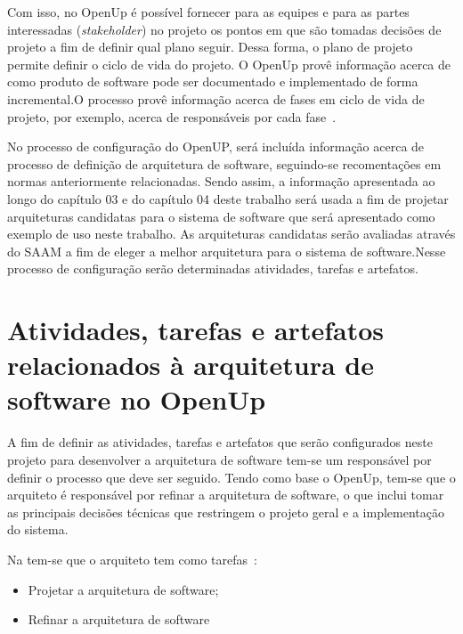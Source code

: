 Com isso, no OpenUp é possível fornecer para as equipes e para as partes interessadas (\emph{stakeholder}) no projeto os pontos em que são tomadas decisões de projeto a fim de definir qual plano seguir. Dessa forma, o plano de projeto permite definir o ciclo de vida do projeto. O \acrfull{OpenUp} provê informação acerca de como produto de software pode ser documentado e implementado de forma incremental.O processo provê informação acerca de fases em ciclo de vida de projeto, por exemplo, acerca de responsáveis por cada fase~\cite{openup}.

No processo de configuração do OpenUP, será incluída informação acerca de processo de definição de arquitetura de software, seguindo-se recomentações em normas anteriormente relacionadas. Sendo assim, a informação apresentada ao longo do capítulo 03 e do capítulo 04 deste trabalho será usada a fim de projetar  arquiteturas candidatas para o sistema de software que será apresentado como exemplo de uso neste trabalho. As arquiteturas candidatas serão avaliadas através do \acrfull{SAAM} a fim de eleger a melhor arquitetura para o sistema de software.Nesse processo de configuração serão determinadas atividades, tarefas e artefatos.


\section{Atividades, tarefas e artefatos relacionados à arquitetura de software no OpenUp}

A fim de definir as atividades, tarefas e artefatos que serão configurados neste projeto para desenvolver a arquitetura de software tem-se um responsável por definir o processo que deve ser seguido. Tendo como base o \acrfull{OpenUp}, tem-se  que o arquiteto é responsável por refinar a arquitetura de software, o que inclui tomar as principais decisões técnicas que restringem o projeto geral e a implementação do sistema. 
 

%

Na  tem-se que o arquiteto tem como tarefas~\cite{openup}:

\begin{itemize}
    \item Projetar a arquitetura de software;
    \item Refinar a arquitetura de software
\end{itemize}  

